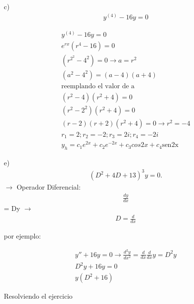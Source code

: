 \documentclass{article}
\begin{document}
c) 
\begin{gather*}
 y^{(4)}-16y=0
\end{gather*}



\begin{gather*}
 y^{(4)}-16y=0 \\
e^{rx}(r^{4}-16)=0 \\
(r^{2}^{2}-4^{2})=0   \rightarrow  a =r^{2} \\
(a^{2}-4^{2}) = (a-4)(a+4) \\
\text{reemplando el valor de a} \\
(r^{2}-4)(r^{2}+4)=0 \\
(r^{2}-2^{2})(r^{2}+4)=0 \\
(r-2)(r+2)(r^{2}+4)=0   \rightarrow r^{2}=-4 \\
r_{1}=2; r_{2}=-2 ; r_{3}=2i; r_{4}=-2i \\
y_{h} =c_{1}e^{2x}+c_{2}e^{-2x}+ c_{3}cos2x+c_{4}\text{sen2x}
\end{gather*}




e)
\begin{gather*}
 (D^{2}+4D+13)^{3}y=0.
\end{gather*}
  $\rightarrow$  Operador Diferencial: 
\begin{gather*}
\frac{dy}{dx}
\end{gather*}
 = Dy  $\rightarrow$  
\begin{gather*}
D = \frac{d}{dx}
\end{gather*}


por ejemplo:


\begin{gather*}
y''+16y = 0 \rightarrow  \frac{d^{2}y}{dx^{2}} = \frac{d}{dx}\frac{d}{dx}y = D^{2}y \\
D^{2}y+16y=0 \\
y(D^{2}+16)
\end{gather*}


Resolviendo el ejercicio
\end{document}
